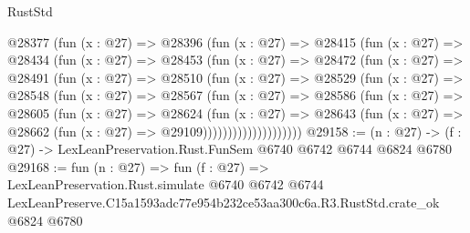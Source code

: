 \begin{lexlean}{RustStd}
\begin{coremodule}
          @28377
            (fun (x : @27) =>
            @28396
              (fun (x : @27) =>
              @28415
                (fun (x : @27) =>
                @28434
                  (fun (x : @27) =>
                  @28453
                    (fun (x : @27) =>
                    @28472
                      (fun (x : @27) =>
                      @28491
                        (fun (x : @27) =>
                        @28510
                          (fun (x : @27) =>
                          @28529
                            (fun (x : @27) =>
                            @28548
                              (fun (x : @27) =>
                              @28567
                                (fun (x : @27) =>
                                @28586
                                  (fun (x : @27) =>
                                  @28605
                                    (fun (x : @27) =>
                                    @28624
                                      (fun (x : @27) =>
                                      @28643
                                        (fun (x : @27) =>
                                        @28662 (fun (x : @27) => @29109))))))))))))))))))))
@29158 := (n : @27) -> (f : @27) -> LexLeanPreservation.Rust.FunSem @6740 @6742 @6744 @6824 @6780
@29168 := fun (n : @27) =>
  fun (f : @27) =>
  LexLeanPreservation.Rust.simulate
    @6740
    @6742
    @6744
    LexLeanPreserve.C15a1593adc77e954b232ce53aa300c6a.R3.RustStd.crate_ok
    @6824
    @6780
\end{coremodule}
\end{lexlean}
